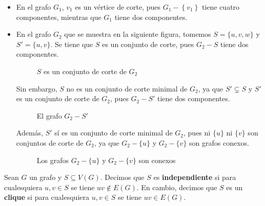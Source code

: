 \begin{Ejm}
   \phantom{o}
   \begin{itemize}
      \item En el grafo $G_1$, $v_1$ es un vértice de corte, pues $G_1-\left\lbrace v_1\right\rbrace$ tiene cuatro componentes, mientras que $G_1$ tiene dos componentes.
         \vspace{-0.5cm}
      \item En el grafo $G_2$ que se muestra en la siguiente figura, tomemos $S=\{u,v,w\}$ y $S'=\{u,v\}$. Se tiene que $S$ es un conjunto de corte, pues $G_2-S$ tiene dos componentes.\vspace{0.1cm}
      \begin{figure}[H]
        \centering
        \resizebox{0.3\textwidth}{!}{}\hspace{2cm}
        \resizebox{0.3\textwidth}{!}{}
        \caption{$S$ es un conjunto de corte de $G_2$}
     \end{figure}\vspace{-0.4cm}
      Sin embargo, $S$ no es un conjunto de corte minimal de $G_2$, ya que $S'\subsetneq S$ y $S'$ es un conjunto de corte de $G_2$, pues $G_2-S'$ tiene dos componentes.
      \begin{figure}[H]
        \centering
          \resizebox{0.3\textwidth}{!}{}
        \caption{El grafo $G_2-S'$}
      \end{figure}
      Además, $S'$ sí es un conjunto de corte minimal de $G_2$, pues ni $\{u\}$ ni $\{v\}$ son conjuntos de corte de $G_2$, ya que $G_2-\{u\}$ y $G_2-\{v\}$ son grafos conexos.\vspace{-1.2cm}
      \begin{figure}[H]
        \centering
           \resizebox{0.3\textwidth}{!}{}\hspace{2cm}
          \resizebox{0.3\textwidth}{!}{}
          \vspace{0.5cm}
        \caption{Los grafos $G_2-\{u\}$ y $G_2-\{v\}$ son conexos}
      \end{figure}
   \end{itemize}
\end{Ejm}
\begin{Def}
   Sean $G$ un grafo y $S\subseteq V(G)$. Decimos que $S$ es \textbf{independiente} si para cualesquiera $u,v\in S$ se tiene $uv\notin E(G)$. En cambio, decimos que $S$ es un \textbf{clique} si para cualesquiera $u,v\in S$ se tiene $uv\in E(G)$.
\end{Def}
